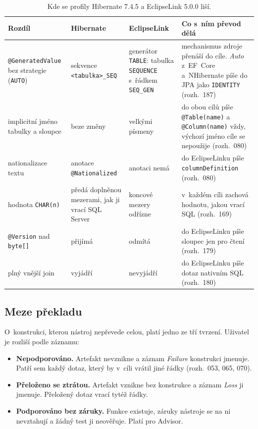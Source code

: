 \begin{table}[H]
\centering\footnotesize
\begin{tabularx}{\textwidth}{L{2.8cm} L{3.6cm} L{2.5cm} Y}
\toprule
\textbf{Rozdíl} & \textbf{Hibernate} & \textbf{EclipseLink} & \textbf{Co s~ním převod dělá} \\
\midrule
\texttt{@GeneratedValue} bez strategie (\texttt{AUTO}) & sekvence \texttt{<tabulka>\_SEQ} & generátor \texttt{TABLE}: tabulka \texttt{SEQUENCE} s~řádkem \texttt{SEQ\_GEN} & mechanismus zdroje přenáší do cíle. \emph{Auto} z~EF~Core a~NHibernate píše do JPA jako \texttt{IDENTITY} (rozh.~187) \\
implicitní jméno tabulky a sloupce & beze změny & velkými písmeny & do obou cílů píše \texttt{@Table(name)} a \texttt{@Column(name)} vždy, výchozí jméno cíle se nepoužije (rozh.~080) \\
nationalizace textu & anotace \texttt{@Nationalized} & anotaci nemá & do EclipseLinku píše \texttt{columnDefinition} (rozh.~080) \\
hodnota \texttt{CHAR(n)} & předá doplněnou mezerami, jak ji vrací SQL Server & koncové mezery odřízne & v~každém cíli zachová hodnotu, jakou vrací SQL (rozh.~169) \\
\texttt{@Version} nad \texttt{byte[]} & přijímá & odmítá & do EclipseLinku píše sloupec jen pro čtení (rozh.~179) \\
plný vnější join & vyjádří & nevyjádří & do EclipseLinku píše dotaz nativním SQL (rozh.~180) \\
\bottomrule
\end{tabularx}%
\caption{Kde se profily Hibernate 7.4.5 a EclipseLink 5.0.0 liší.}
\label{tab:profily}
\end{table}

\subsection{Meze překladu}\label{sec:limity}

O~konstrukci, kterou nástroj nepřevede celou, platí jedno ze tří tvrzení. Uživatel je rozliší podle záznamu:

\begin{itemize}[leftmargin=*,itemsep=1pt]
\item \textbf{Nepodporováno.} Artefakt nevznikne a záznam \emph{Failure} konstrukci jmenuje. Patří sem každý dotaz, který by v~cíli vrátil jiné řádky (rozh.~053, 065, 070).
\item \textbf{Přeloženo se ztrátou.} Artefakt vznikne bez konstrukce a záznam \emph{Loss} ji jmenuje. Přeložený dotaz vrací tytéž řádky.
\item \textbf{Podporováno bez záruky.} Funkce existuje, záruky nástroje se na ni nevztahují a žádný test ji neověřuje. Platí pro Advisor.
\end{itemize}

